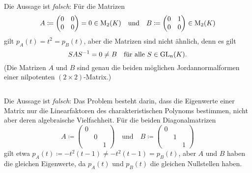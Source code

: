 \section{}





\subsection{}

Die Aussage ist \emph{falsch}:
Für die Matrizen
\[
            A
  \coloneqq \begin{pmatrix}
              0 & 0
              \\
              0 & 0
            \end{pmatrix}
  =         0
  \in       \operatorname{M}_{2}(K)
  \quad\text{und}\quad
            B
  \coloneqq \begin{pmatrix}
              0 & 1
              \\
              0 & 0
            \end{pmatrix}
  \in       \operatorname{M}_{2}(K)
\]
gilt $p_A(t) = t^2 = p_B(t)$, aber die Matrizen sind nicht ähnlich, denn es gilt
\[
        S A S^{-1} 
  =     0
  \neq  B
  \quad
  \text{für alle $S \in \operatorname{GL}_{n}(K)$}.
\]
(Die Matrizen $A$ und $B$ sind genau die beiden möglichen Jordannormalformen einer nilpotenten $(2 \times 2)$-Matrix.)





\subsection{}

Die Aussage ist \emph{falsch}:
Das Problem besteht darin, dass die Eigenwerte einer Matrix nur die Linearfaktoren des charakteristischen Polynoms bestimmen, nicht aber deren algebraische Vielfachheit.
Für die beiden Diagonalmatrizen
\[
            A
  \coloneqq \begin{pmatrix}
              0 &   &
              \\
                & 0 &
              \\
                &   & 1
            \end{pmatrix}
  \quad\text{und}\quad
            B
  \coloneqq \begin{pmatrix}
              0 &   &
              \\
                & 1 &
              \\
                &   & 1
            \end{pmatrix}
\]
gilt etwa $p_A(t) \coloneqq - t^2 (t-1) \neq - t^2 (t-1) = p_B(t)$, aber $A$ und $B$ haben die gleichen Eigenwerte, da $p_A(t)$ und $p_B(t)$ die gleichen Nullstellen haben.





